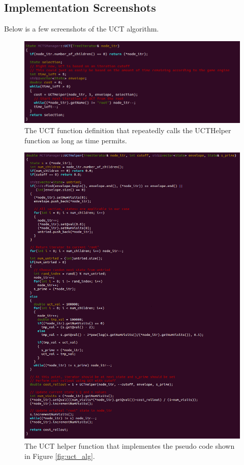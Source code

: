 \documentclass[a4paper,11pt]{article}
\begin{document}
\begin{appendices}
\section{Implementation Screenshots}
Below is a few screenshots of the UCT algorithm.


%
\begin{figure}[!htbp]
  \centering
  \includegraphics[width=0.72\columnwidth]{uct_implementation}
  \caption{The UCT function definition that repeatedly calls the UCTHelper function as long as time permits.}
  \label{fig:uct_imp}
\end{figure}
%

%
\begin{figure}[!htbp]
  \centering
  \includegraphics[width=0.72\columnwidth]{uct_helper_implementation}
  \caption{The UCT helper function that implementes the pseudo code shown in Figure \ref{fig:uct_alg}.}
  \label{fig:uct_imp}
\end{figure}
%



\end{appendices}
\end{document}
